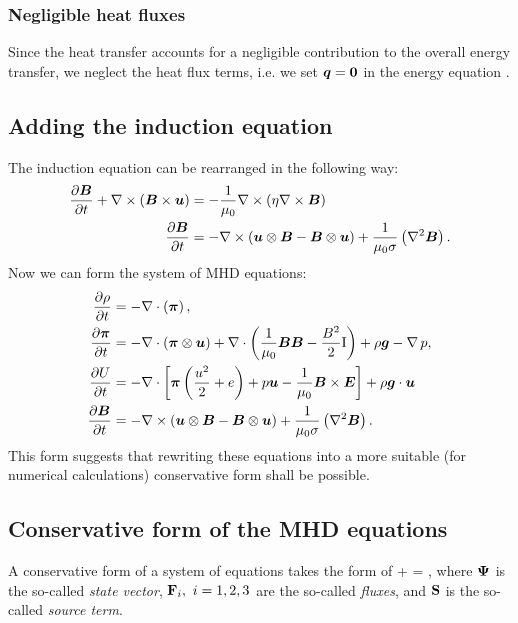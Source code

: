 \subsubsection{Negligible heat fluxes}
Since the heat transfer accounts for a negligible contribution to the overall energy transfer, we neglect the heat flux terms, i.e. we set $\mbox{\boldmath $q$} = \mathbf{0}$ in the energy equation .

\subsection{Adding the induction equation}
The induction equation  can be rearranged in the following way:
\begin{align}
\frac{\partial{\mbox{\boldmath $B$}}}{\partial{t}} + \nabla \times \left( \mbox{\boldmath $B$} \times \mbox{\boldmath $u$} \right) & =  -\frac{1}{\mu_0} \nabla \times \left( \eta \nabla \times \mbox{\boldmath $B$} \right)\\
\label{InductionPreFinal} \frac{\partial{\mbox{\boldmath $B$}}}{\partial{t}} & =  - \nabla \times \left( \mbox{\boldmath $u$} \otimes \mbox{\boldmath $B$} - \mbox{\boldmath $B$} \otimes \mbox{\boldmath $u$} \right) + \frac{1}{\mu_{0}\sigma} \left( \nabla^2 \mbox{\boldmath $B$} \right).
\end{align}
Now we can form the system of MHD equations:
\begin{align}
\label{ContinuityEqFinal} \frac{\partial{\rho}}{\partial{t}} & =  - \nabla\cdot\left(\mbox{\boldmath $\pi$}\right),\\
\label{NSEqFinal} \frac{\partial{\mbox{\boldmath $\pi$}}}{\partial{t}} & =  - \nabla\cdot\left(\mbox{\boldmath $\pi$}\otimes\mbox{\boldmath $u$}\right) + \nabla\cdot\left(\frac{1}{\mu_0}\mbox{\boldmath $B$}\mbox{\boldmath $B$} - \frac{B^2}{2}\mathrm{I}\right) + \rho\mbox{\boldmath $g$} - \nabla\,p,\\
\label{EnergyEqFinal} \frac{\partial{U}}{\partial{t}} & =  -\nabla\cdot\left[\mbox{\boldmath $\pi$}\left( \frac{u^2}{2} + e\right) + p \mbox{\boldmath $u$} - \frac{1}{\mu_0}\mbox{\boldmath $B$}\times\mbox{\boldmath $E$}\right] + \rho \mbox{\boldmath $g$} \cdot \mbox{\boldmath $u$}\\
\label{InductionFinal} \frac{\partial{\mbox{\boldmath $B$}}}{\partial{t}} & =  - \nabla \times \left( \mbox{\boldmath $u$} \otimes \mbox{\boldmath $B$} - \mbox{\boldmath $B$} \otimes \mbox{\boldmath $u$} \right) + \frac{1}{\mu_{0}\sigma} \left( \nabla^2 \mbox{\boldmath $B$} \right).
\end{align}
This form suggests that rewriting these equations into a more suitable (for numerical calculations) conservative form shall be possible.
\subsection{Conservative form of the MHD equations}
A conservative form of a system of equations takes the form of
\be
\label{conservativeGeneric}  + \nabla \cdot \mrF\lo\mrPsi\ro = \mrS,
\ee
where $\mathrm{\mathbf{\Psi}}$ is the so-called \textit{state vector}, $\mathrm{\mathbf{F}}_i,\ i = 1, 2, 3$ are the so-called \textit{fluxes}, and $\mathrm{\mathbf{S}}$ is the so-called \textit{source term}.
